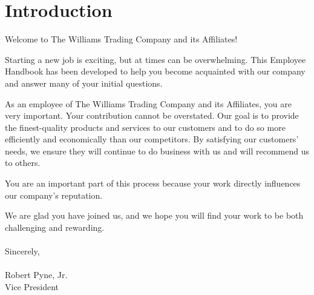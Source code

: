 \section{Introduction}

Welcome to The Williams Trading Company and its Affiliates!

Starting a new job is exciting, but at times can be overwhelming. This Employee Handbook has been developed to help you become acquainted with our company and answer many of your initial questions.

As an employee of The Williams Trading Company and its Affiliates, you are very important. Your contribution cannot be overstated. Our goal is to provide the finest-quality products and services to our customers and to do so more efficiently and economically than our competitors. By satisfying our customers' needs, we ensure they will continue to do business with us and will recommend us to others.

You are an important part of this process because your work directly influences our company's reputation.

We are glad you have joined us, and we hope you will find your work to be both challenging and rewarding.
\\
\\
Sincerely,
\\
\\
Robert Pyne, Jr.\\
Vice President